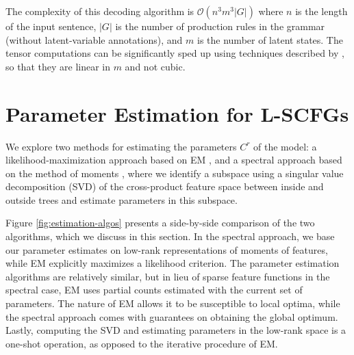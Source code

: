 \documentclass[11pt]{article}
\newcommand{\shaycomment}[1]{\textcolor{blue}{#1 -- Shay}}
\newcommand{\avcomment}[1]{\textcolor{orange}{\textbf{[#1 -- Av]}}}
\begin{document}
The complexity of this decoding algorithm is $\mathcal{O}(n^3 m^3 |G|)$ where $n$ is the length of the input sentence, $|G|$ is the number of production rules in the grammar (without latent-variable annotations), and $m$ is the number of latent states.
The tensor computations can be significantly
sped up using techniques described by , so that they are linear in $m$ and not cubic.  

\section{Parameter Estimation for L-SCFGs}
\label{sec:estimation}
We explore two methods for estimating the parameters $C^r$ of the model: a likelihood-maximization approach based on EM \cite{Dempster1977}, and a spectral approach based on the method of moments \cite{Hsu2009,cohen-14b}, where we identify a subspace using a singular value decomposition (SVD)
of the cross-product feature space between inside and outside trees and estimate parameters in this subspace. 

Figure \ref{fig:estimation-algos} presents a side-by-side comparison of the two algorithms, which we discuss in this section.  
In the spectral approach, we base our parameter estimates on low-rank representations of moments of features, while EM explicitly maximizes a likelihood criterion. 
The parameter estimation algorithms are relatively similar, but in lieu of sparse feature functions in the spectral case, EM uses partial counts estimated with the current set of parameters.  
The nature of EM allows it to be susceptible to local optima, while the spectral approach comes with guarantees on obtaining the global optimum. 
Lastly, computing the SVD and estimating parameters in the low-rank space is a one-shot operation, as opposed to the iterative procedure of EM. 
\end{document}
